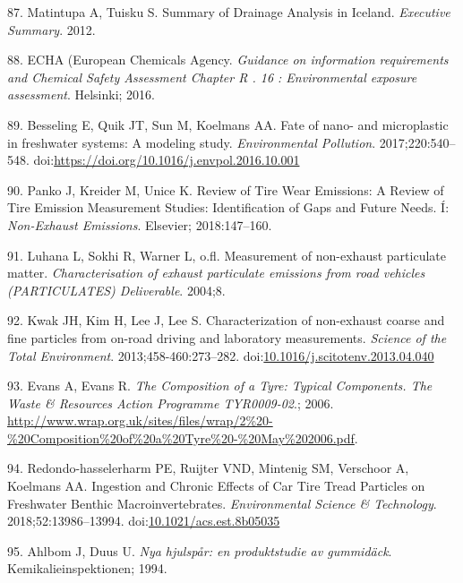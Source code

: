 \documentclass[icelandic,]{book}
\begin{document}
\leavevmode\hypertarget{ref-Matinupa2012Summary}{}%
87. Matintupa A, Tuisku S. Summary of Drainage Analysis in Iceland. \emph{Executive Summary}. 2012.

\leavevmode\hypertarget{ref-ECHA2016}{}%
88. ECHA (European Chemicals Agency. \emph{Guidance on information requirements and Chemical Safety Assessment Chapter R . 16 : Environmental exposure assessment}. Helsinki; 2016.

\leavevmode\hypertarget{ref-BESSELING2017540}{}%
89. Besseling E, Quik JT, Sun M, Koelmans AA. Fate of nano- and microplastic in freshwater systems: A modeling study. \emph{Environmental Pollution}. 2017;220:540--548. doi:\href{https://doi.org/https://doi.org/10.1016/j.envpol.2016.10.001}{https://doi.org/10.1016/j.envpol.2016.10.001}

\leavevmode\hypertarget{ref-panko2018review}{}%
90. Panko J, Kreider M, Unice K. Review of Tire Wear Emissions: A Review of Tire Emission Measurement Studies: Identification of Gaps and Future Needs. Í: \emph{Non-Exhaust Emissions}. Elsevier; 2018:147--160.

\leavevmode\hypertarget{ref-luhana2004measurement}{}%
91. Luhana L, Sokhi R, Warner L, o.fl. Measurement of non-exhaust particulate matter. \emph{Characterisation of exhaust particulate emissions from road vehicles (PARTICULATES) Deliverable}. 2004;8.

\leavevmode\hypertarget{ref-Kwak2013}{}%
92. Kwak JH, Kim H, Lee J, Lee S. Characterization of non-exhaust coarse and fine particles from on-road driving and laboratory measurements. \emph{Science of the Total Environment}. 2013;458-460:273--282. doi:\href{https://doi.org/10.1016/j.scitotenv.2013.04.040}{10.1016/j.scitotenv.2013.04.040}

\leavevmode\hypertarget{ref-Evans2006}{}%
93. Evans A, Evans R. \emph{The Composition of a Tyre: Typical Components. The Waste \& Resources Action Programme TYR0009-02}.; 2006. \url{http://www.wrap.org.uk/sites/files/wrap/2\%20-\%20Composition\%20of\%20a\%20Tyre\%20-\%20May\%202006.pdf}.

\leavevmode\hypertarget{ref-Redondo-hasselerharm2018}{}%
94. Redondo-hasselerharm PE, Ruijter VND, Mintenig SM, Verschoor A, Koelmans AA. Ingestion and Chronic Effects of Car Tire Tread Particles on Freshwater Benthic Macroinvertebrates. \emph{Environmental Science \& Technology}. 2018;52:13986--13994. doi:\href{https://doi.org/10.1021/acs.est.8b05035}{10.1021/acs.est.8b05035}

\leavevmode\hypertarget{ref-ahlbom1994nya}{}%
95. Ahlbom J, Duus U. \emph{Nya hjulspår: en produktstudie av gummidäck}. Kemikalieinspektionen; 1994.
\end{document}
